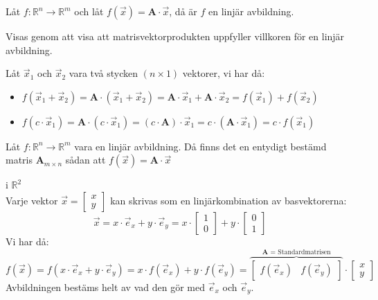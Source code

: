 \begin{sats}
    Låt $f: \mathbb{R}^n \rightarrow \mathbb{R}^m$ och låt $f(\vec{x}) = \mathbf{A} \cdot \vec{x}$, då är $f$ en linjär avbildning.
\end{sats}
\noindent
Visas genom att visa att matrisvektorprodukten uppfyller villkoren för en linjär avbildning.
\begin{bevis}
Låt $\vec{x}_1$ och $\vec{x}_2$ vara två stycken $(n \times 1)$ vektorer, vi har då:
	\begin{itemize}
		\item $f(\vec{x}_1 + \vec{x}_2) = \mathbf{A} \cdot (\vec{x}_1 + \vec{x}_2) = \mathbf{A} \cdot \vec{x}_1 + \mathbf{A} \cdot \vec{x}_2 = f(\vec{x}_1) + f(\vec{x}_2)$
		\item $f(c \cdot \vec{x}_1) = \mathbf{A} \cdot (c \cdot \vec{x}_1) = (c \cdot \mathbf{A}) \cdot \vec{x}_1 = c \cdot (\mathbf{A} \cdot \vec{x}_1) = c \cdot f(\vec{x}_1)$
	\end{itemize}
\end{bevis}
\begin{sats}[Bassatsen]
    Låt $f: \mathbb{R}^n \rightarrow \mathbb{R}^m$ vara en linjär avbildning. Då finns det en entydigt bestämd matris $\mathbf{A}_{m \times n}$ sådan att $f(\vec{x}) = \mathbf{A} \cdot \vec{x}$
\end{sats}
\begin{bevis}
	i $\mathbb{R}^2$\\
	Varje vektor $\vec{x} = \begin{bmatrix} x\\y \end{bmatrix}$ kan skrivas som en linjärkombination av basvektorerna:
	\[
	   \vec{x} = x \cdot \vec{e}_x + y \cdot \vec{e}_y = x \cdot \begin{bmatrix} 1\\0 \end{bmatrix} + y \cdot \begin{bmatrix} 0\\1 \end{bmatrix}
	 \]
	 Vi har då:
	 \[
	     f(\vec{x}) = f(x \cdot \vec{e}_x + y \cdot \vec{e}_y) = x \cdot f(\vec{e}_x) + y \cdot f(\vec{e}_y) = \overbrace{\begin{bmatrix} f(\vec{e}_x)&f(\vec{e}_y) \end{bmatrix}}^\text{$\mathbf{A}$ = Standardmatrisen} \cdot \begin{bmatrix} x\\y \end{bmatrix}
	 \]
	 Avbildningen bestäms helt av vad den gör med $\vec{e}_x$ och $\vec{e}_y$. 
\end{bevis}

